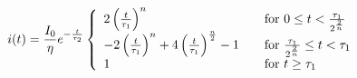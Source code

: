\begin{equation}
i(t) = \frac{I_0}{\eta} e^{-\frac{t}{\tau_2}} \left\{
  \begin{array}{l l}
    2 \left( \frac{t}{\tau_1} \right )^n & \quad \textrm{for $0 \leq t < \frac{\tau_1}{2^{\frac{2}{n}}}$} \\
    -2 \left( \frac{t}{\tau_1} \right )^n +4 \left( \frac{t}{\tau_1} \right )^{\frac{n}{2}} -1 & \quad \textrm{for $\frac{\tau_1}{2^{\frac{2}{n}}} \leq t < \tau_1$} \\
    1 & \quad \textrm{for $t \geq \tau_1$}
  \end{array} \right.
\label{eqn:TF}
\end{equation}